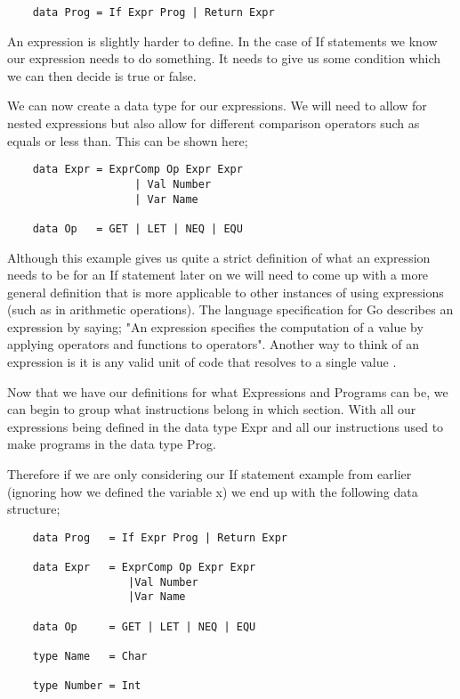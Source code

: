 
\begin{lstlisting}
	data Prog = If Expr Prog | Return Expr
\end{lstlisting}


An expression is slightly harder to define. In the case of If statements we know our expression needs to do something. It needs to give us some condition which we can then decide is true or false. 

We can now create a data type for our expressions. We will need to allow for nested expressions but also allow for different comparison operators such as equals or less than. This can be shown here;

\newpage

\begin{lstlisting}
	data Expr = ExprComp Op Expr Expr 
                  	| Val Number 
                 	| Var Name
 
	data Op	  = GET | LET | NEQ | EQU
\end{lstlisting}

Although this example gives us quite a strict definition of what an expression needs to be for an If statement later on we will need to come up with a more general definition that is more applicable to other instances of using expressions (such as in arithmetic operations). The language specification for Go describes an expression by saying; "An expression specifies the computation of a value by applying operators and functions to operators". Another way to think of an expression is it is any valid unit of code that resolves to a single value \footnotemark[3].


Now that we have our definitions for what Expressions and Programs can be, we can begin to group what instructions belong in which section. With all our expressions being defined in the data type Expr and all our instructions used to make programs in the data type Prog.

Therefore if we are only considering our If statement example from earlier (ignoring how we defined the variable  x) we end up with the following data structure;

\begin{lstlisting}
	data Prog   = If Expr Prog | Return Expr

	data Expr   = ExprComp Op Expr Expr 
	               |Val Number 
	               |Var Name 

	data Op     = GET | LET | NEQ | EQU

	type Name   = Char

	type Number = Int
\end{lstlisting}

